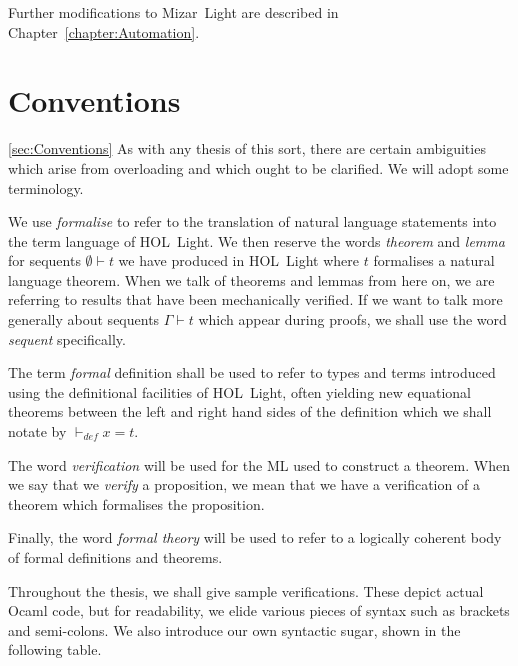 Further modifications to Mizar~Light are described in Chapter~\ref{chapter:Automation}.

\section{Conventions}\ref{sec:Conventions}
As with any thesis of this sort, there are certain ambiguities which arise from overloading and which ought to be clarified. We will adopt some terminology.

We use \emph{formalise} to refer to the translation of natural language statements into the term language of HOL~Light. We then reserve the words \emph{theorem} and \emph{lemma} for sequents $\emptyset \vdash t$ we have produced in HOL~Light where $t$ formalises a natural language theorem. When we talk of theorems and lemmas from here on, we are referring to results that have been mechanically verified. If we want to talk more generally about sequents $\Gamma\vdash t$ which appear during proofs, we shall use the word \emph{sequent} specifically.

The term \emph{formal} definition shall be used to refer to types and terms introduced using the definitional facilities of HOL~Light, often yielding new equational theorems between the left and right hand sides of the definition which we shall notate by $\vdash_{def} x = t$.

The word \emph{verification}  will be used for the ML used to construct a theorem. When we say that we \emph{verify} a proposition, we mean that we have a verification of a theorem which formalises the proposition.

Finally, the word \emph{formal theory} will be used to refer to a logically coherent body of formal definitions and theorems.

Throughout the thesis, we shall give sample verifications. These depict actual Ocaml code, but for readability, we elide various pieces of syntax such as brackets and semi-colons. We also introduce our own syntactic sugar, shown in the following table.

